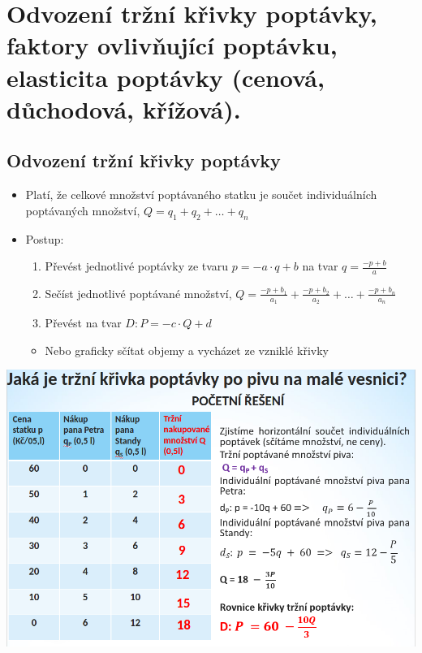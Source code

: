 \clearpage
\section{Odvození tržní křivky poptávky, faktory ovlivňující poptávku, elasticita poptávky
(cenová, důchodová, křížová).}

\subsection{Odvození tržní křivky poptávky}
\begin{itemize}
    \item Platí, že celkové množství poptávaného statku je součet individuálních poptávaných množství, $Q=q_1+q_2+\dots +q_n$
    \item Postup:
    \begin{enumerate}
        \item Převést jednotlivé poptávky ze tvaru $p=-a\cdot q+b$ na tvar $q=\frac{-p+b}{a}$
        \item Sečíst jednotlivé poptávané množství, $Q=\frac{-p+b_1}{a_1}+\frac{-p+b_2}{a_2}+\dots+\frac{-p+b_n}{a_n}$
        \item Převést na tvar $D: P=-c\cdot Q+d$
    \end{enumerate}
    \begin{itemize}
        \item Nebo graficky sčítat objemy a vycházet ze vzniklé křivky
    \end{itemize}
\end{itemize}
\includegraphics[width=16cm]{images/07_odvozeni_poptavky.png}\\

